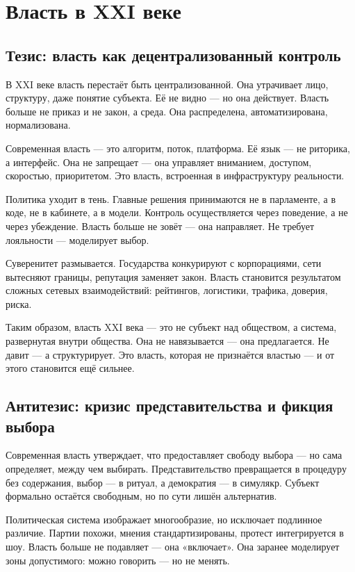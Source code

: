 \chapter{Власть в XXI веке}

\section{Тезис: власть как децентрализованный контроль}

В XXI веке власть перестаёт быть централизованной. Она утрачивает лицо, структуру, даже понятие субъекта. Её не видно — но она действует. Власть больше не приказ и не закон, а среда. Она распределена, автоматизирована, нормализована.

Современная власть — это алгоритм, поток, платформа. Её язык — не риторика, а интерфейс. Она не запрещает — она управляет вниманием, доступом, скоростью, приоритетом. Это власть, встроенная в инфраструктуру реальности.

Политика уходит в тень. Главные решения принимаются не в парламенте, а в коде, не в кабинете, а в модели. Контроль осуществляется через поведение, а не через убеждение. Власть больше не зовёт — она направляет. Не требует лояльности — моделирует выбор.

Суверенитет размывается. Государства конкурируют с корпорациями, сети вытесняют границы, репутация заменяет закон. Власть становится результатом сложных сетевых взаимодействий: рейтингов, логистики, трафика, доверия, риска.

Таким образом, власть XXI века — это не субъект над обществом, а система, развернутая внутри общества. Она не навязывается — она предлагается. Не давит — а структурирует. Это власть, которая не признаётся властью — и от этого становится ещё сильнее.

\section{Антитезис: кризис представительства и фикция выбора}

Современная власть утверждает, что предоставляет свободу выбора — но сама определяет, между чем выбирать. Представительство превращается в процедуру без содержания, выбор — в ритуал, а демократия — в симулякр. Субъект формально остаётся свободным, но по сути лишён альтернатив.

Политическая система изображает многообразие, но исключает подлинное различие. Партии похожи, мнения стандартизированы, протест интегрируется в шоу. Власть больше не подавляет — она «включает». Она заранее моделирует зоны допустимого: можно говорить — но не менять.


